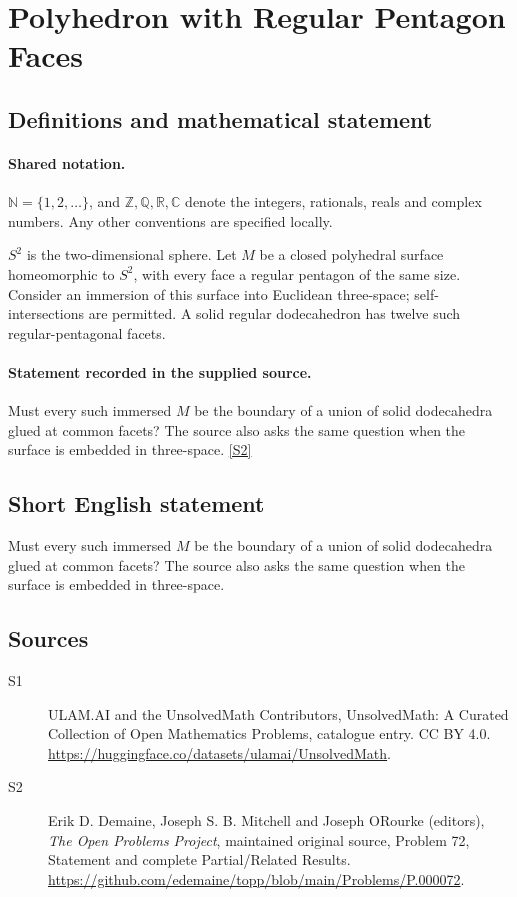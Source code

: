 \documentclass[11pt]{article}
\newcommand{\sref}[2]{\hyperlink{source:#1:#2}{[S#2]}}
\begin{document}
\section{Polyhedron with Regular Pentagon Faces}\label{statement}

\subsection{Definitions and mathematical statement}

\paragraph{Shared notation.}$\mathbb N=\{1,2,\ldots\}$, and $\mathbb Z,\mathbb Q,\mathbb R,\mathbb C$ denote the integers, rationals, reals and complex numbers. Any other conventions are specified locally.


$S^2$ is the two-dimensional sphere. Let $M$ be a closed polyhedral surface homeomorphic to $S^2$, with every face a regular pentagon of the same size. Consider an immersion of this surface into Euclidean three-space; self-intersections are permitted. A solid regular dodecahedron has twelve such regular-pentagonal facets.
\paragraph{Statement recorded in the supplied source.}
Must every such immersed $M$ be the boundary of a union of solid dodecahedra glued at common facets? The source also asks the same question when the surface is embedded in three-space. \sref{statement}{2}
\subsection{Short English statement}
Must every such immersed $M$ be the boundary of a union of solid dodecahedra glued at common facets? The source also asks the same question when the surface is embedded in three-space.
\subsection{Sources}
\begin{description}
\item[\hypertarget{source:statement:1}{S1}] ULAM.AI and the UnsolvedMath Contributors, UnsolvedMath: A Curated Collection of Open Mathematics Problems, catalogue entry. CC BY 4.0. \url{https://huggingface.co/datasets/ulamai/UnsolvedMath}.
\item[\hypertarget{source:statement:2}{S2}] Erik D. Demaine, Joseph S. B. Mitchell and Joseph O\textquotesingle Rourke (editors), \emph{The Open Problems Project}, maintained original source, Problem 72, Statement and complete Partial/Related Results. \url{https://github.com/edemaine/topp/blob/main/Problems/P.000072}.
\end{description}
\label{end:statement}
\end{document}
